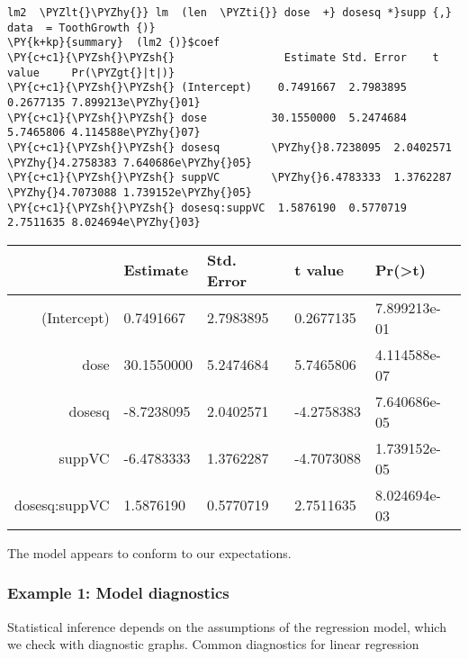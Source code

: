     \begin{tcolorbox}[breakable, size=fbox, boxrule=1pt, pad at break*=1mm,colback=cellbackground, colframe=cellborder]
\begin{Verbatim}[commandchars=\\\{\}]
lm2  \PYZlt{}\PYZhy{}} lm  (len  \PYZti{}} dose  +} dosesq *}supp {,} data  = ToothGrowth {)}
\PY{k+kp}{summary}  (lm2 {)}$coef
\PY{c+c1}{\PYZsh{}\PYZsh{}                 Estimate Std. Error    t value     Pr(\PYZgt{}|t|)}
\PY{c+c1}{\PYZsh{}\PYZsh{} (Intercept)    0.7491667  2.7983895  0.2677135 7.899213e\PYZhy{}01}
\PY{c+c1}{\PYZsh{}\PYZsh{} dose          30.1550000  5.2474684  5.7465806 4.114588e\PYZhy{}07}
\PY{c+c1}{\PYZsh{}\PYZsh{} dosesq        \PYZhy{}8.7238095  2.0402571 \PYZhy{}4.2758383 7.640686e\PYZhy{}05}
\PY{c+c1}{\PYZsh{}\PYZsh{} suppVC        \PYZhy{}6.4783333  1.3762287 \PYZhy{}4.7073088 1.739152e\PYZhy{}05}
\PY{c+c1}{\PYZsh{}\PYZsh{} dosesq:suppVC  1.5876190  0.5770719  2.7511635 8.024694e\PYZhy{}03}
\end{Verbatim}
\end{tcolorbox}

    \begin{tabular}{r|llll}
  & Estimate & Std. Error & t value & Pr(>\textbar{}t\textbar{})\\
\hline
	(Intercept) &  0.7491667   & 2.7983895    &  0.2677135   & 7.899213e-01\\
	dose & 30.1550000   & 5.2474684    &  5.7465806   & 4.114588e-07\\
	dosesq & -8.7238095   & 2.0402571    & -4.2758383   & 7.640686e-05\\
	suppVC & -6.4783333   & 1.3762287    & -4.7073088   & 1.739152e-05\\
	dosesq:suppVC &  1.5876190   & 0.5770719    &  2.7511635   & 8.024694e-03\\
\end{tabular}


    
    The model appears to conform to our expectations.

    \subsubsection{Example 1: Model
diagnostics}\label{example-1-model-diagnostics}

Statistical inference depends on the assumptions of the regression
model, which we check with diagnostic graphs. Common diagnostics for
linear regression



